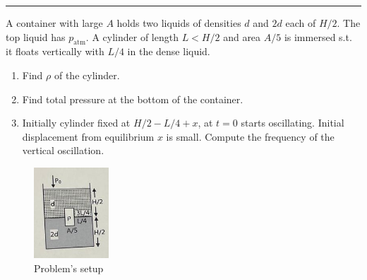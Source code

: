 \documentclass[10pt]{extarticle}
\newcommand{\horizonalline}{\noindent\rule{\textwidth}{1pt}}
\begin{document}
\horizonalline

\begin{question}{}{}
    A container with large $A$ holds two liquids of densities $d$ and $2d$ each of $H/2$. The top liquid has $p_\text{atm}$.
    A cylinder of length $L < H/2$ and area $A/5$ is immersed s.t. it floats vertically with $L/4$ in the dense liquid.

    \begin{enumerate}
        \item Find $\rho$ of the cylinder.
        \item Find total pressure at the bottom of the container.
        \item Initially cylinder fixed at $H/2 - L/4 + x$, at $t = 0$ starts oscillating. Initial displacement from equilibrium $x$ is small.
              Compute the frequency of the vertical oscillation.
    \end{enumerate}

    \begin{figure}[H]
        \centering
        \includegraphics[width=0.25\textwidth]{assets/S2_P2_PHY1_Exercises/25_may_24-ex3.jpg}
        \caption{Problem's setup}
    \end{figure}
\end{question}
\end{document}
